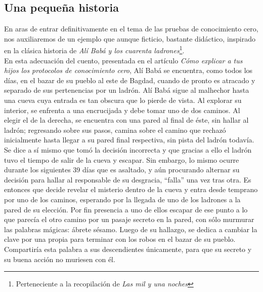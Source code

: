 \documentclass[oneside,10pt]{article}
\begin{document}
\subsection{Una pequeña historia}
En aras de entrar definitivamente en el tema de las pruebas de conocimiento cero, nos auxiliaremos
de un ejemplo que aunque ficticio, bastante didáctico, inspirado en la clásica historia de
\textit{Alí Babá y los cuarenta ladrones}\footnote{Perteneciente a la recopilación de \textit{Las mil y una noches}}. \\ En esta adecuación del cuento, presentada en el artículo \textit{Cómo explicar a tus hijos los protocolos de conocimiento cero}\cite{quisquater}, Alí Babá se encuentra, como todos los
días, en el bazar de su pueblo al este de Bagdad, cuando de pronto es atracado y separado de sus
pertenencias por un ladrón. Alí Babá sigue al malhechor hasta una cueva cuya entrada es tan obscura
que lo pierde de vista. Al explorar su interior, se enfrenta a una encrucijada y debe tomar uno de
dos caminos. Al elegir el de la derecha, se encuentra con una pared al final de éste, sin hallar al
ladrón; regresando sobre sus pasos, camina sobre el camino que rechazó inicialmente hasta llegar a su pared final respectiva, sin pista del ladrón todavía. Se dice a sí mismo que tomó la decisión incorrecta y que gracias a ello el ladrón tuvo el tiempo de salir de la cueva y escapar. Sin embargo, lo mismo ocurre
durante los siguientes 39 días que es asaltado, y aún procurando alternar su decisión para hallar al responsable
de su desgracia, ``falla'' una vez tras otra. Es entonces que decide revelar el misterio dentro de la cueva y entra
desde temprano por uno de los caminos, esperando por la llegada de uno de los ladrones a la pared de su elección. Por fin presencia a uno de ellos escapar de ese punto a lo que parecía el otro camino por un pasaje secreto en la pared, con sólo murmurar las palabras mágicas: ábrete sésamo. Luego de su hallazgo, se dedica a cambiar la clave por una propia para terminar con los robos en el bazar de su pueblo. Compartiría esta palabra a sus descendientes únicamente, para que su secreto y su buena acción no muriesen con él. \\
\end{document}
